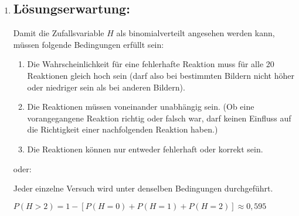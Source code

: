 \begin{langesbeispiel}
{\begin{enumerate}
		Mögliches Argument:
		
		Durch die beiden "`Ausreißer"' 32,8 und 35,4 wird das arithmetische Mittel stark nach oben verzerrt. Das alternative Zentralmaß \textit{Median} ist gegenüber Ausreißern robust.\leer
		
		Die Aussage ist so nicht korrekt, da aus dem Kastenschaubild nicht hervorgeht, ob es mehrere Reaktionszeiten gibt, die genau $22,4$\,s betragen und die im zweiten Viertel der geordneten Datenreihe liege.

	\subsection{Lösungsschlüssel:}
	
\begin{itemize}
	\item   Ein Punkt für ein richtiges Argument und die Angabe des Medians als alternatives Zentralmaß.
	\item  Ein Punkt für eine korrekte Entscheidung und eine (sinngemäß) korrekte Begründung.
\end{itemize}

	\item \subsection{Lösungserwartung:}
			
		Damit die Zufallsvariable $H$ als binomialverteilt angesehen werden kann, müssen folgende Bedingungen erfüllt sein:
		
		
		\begin{enumerate}
			\item  Die Wahrscheinlichkeit für eine fehlerhafte Reaktion muss für alle 20 Reaktionen gleich hoch sein (darf also bei bestimmten Bildern nicht höher oder niedriger sein als bei anderen Bildern).
			\item  Die Reaktionen müssen voneinander unabhängig sein. (Ob eine vorangegangene Reaktion richtig oder falsch war, darf keinen Einfluss auf die Richtigkeit einer nachfolgenden Reaktion haben.)
			\item  Die Reaktionen können nur entweder fehlerhaft oder korrekt sein.
		\end{enumerate}
		
		oder:\leer
		
		Jeder einzelne Versuch wird unter denselben Bedingungen durchgeführt.\leer
		
		$P(H>2)=1-[P(H=0)+P(H=1)+P(H=2)]\approx 0,595$


\end{enumerate}}
\end{langesbeispiel}
